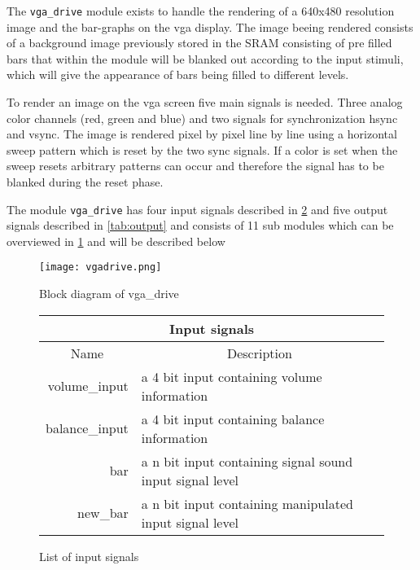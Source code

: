 The \verb+vga_drive+ module exists to handle the rendering of a 640x480 resolution image and the bar-graphs on
the vga display. The image beeing rendered consists of a background image previously 
stored in the SRAM consisting of pre filled bars that within the module will be blanked
out according to the input stimuli, which will give the appearance of bars being filled 
to different levels.   

To render an image on the vga screen five main signals is needed. Three analog color channels (red, green and blue)
and two signals for synchronization hsync and vsync. The image is rendered pixel by pixel line by line using
a horizontal sweep pattern which is reset by the two sync signals. If a color is set when the sweep resets
arbitrary patterns can occur and therefore the signal has to be blanked during the reset phase.

The module \verb+vga_drive+ has four input signals described in \ref{tab:input} and five output signals described
in \ref{tab:output} and consists of 11 sub modules which can be overviewed in \ref{fig:vgadrive} and will be described below


\begin{figure}[H]
        \texttt{[image: vgadrive.png]}
        \caption{Block diagram of vga\_drive}
        \label{fig:vgadrive}
\end{figure}


\begin{figure}[h]
        \caption{List of input signals}
        \label{tab:input}
\begin{tabular}{|r|l|}
        \hline
        \multicolumn{2}{|c|}{Input signals}\\
        \hline
        \multicolumn{1}{|c}{Name} & \multicolumn{1}{c|}{Description} \\
        \hline
        volume\_input & a 4 bit input containing volume information\\
        \cline{1-2}
        \hline
        balance\_input & a 4 bit input containing balance information\\
        \cline{1-2}    
        \hline
        bar & a n bit input containing signal sound input signal level\\
        \cline{1-2}    
        \hline
        new\_bar & a n bit input containing manipulated input signal level\\
        \cline{1-2}    
        \hline
\end{tabular}
\end{figure}

